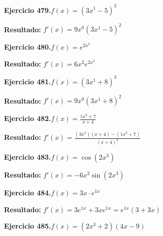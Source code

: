 \documentclass[10pt,a4paper]{article}
\begin{document}
\begin{ejbox}
\textbf{Ejercicio 479.}\quad $f(x) = (3x^{1} -5)^{3}$
\end{ejbox}

\begin{solbox}
\textbf{Resultado:} \(\displaystyle f'(x) = 9x^{0}(3x^{1} -5)^{2}\)
\end{solbox}

\begin{ejbox}
\textbf{Ejercicio 480.}\quad $f(x) = e^{2x^{3}}$
\end{ejbox}

\begin{solbox}
\textbf{Resultado:} \(\displaystyle f'(x) = 6x^{2}e^{2x^{3}}\)
\end{solbox}

\newpage
\begin{ejbox}
\textbf{Ejercicio 481.}\quad $f(x) = (3x^{1} +8)^{3}$
\end{ejbox}

\begin{solbox}
\textbf{Resultado:} \(\displaystyle f'(x) = 9x^{0}(3x^{1} +8)^{2}\)
\end{solbox}

\begin{ejbox}
\textbf{Ejercicio 482.}\quad $f(x) = \frac{1x^{3} +7}{x + 4}$
\end{ejbox}

\begin{solbox}
\textbf{Resultado:} \(\displaystyle f'(x) = \frac{(3x^{2})(x+4) - (1x^{3} +7)}{(x+4)^2}\)
\end{solbox}

\begin{ejbox}
\textbf{Ejercicio 483.}\quad $f(x) = \cos(2x^{3})$
\end{ejbox}

\begin{solbox}
\textbf{Resultado:} \(\displaystyle f'(x) = -6x^{2}\sin(2x^{3})\)
\end{solbox}

\newpage
\begin{ejbox}
\textbf{Ejercicio 484.}\quad $f(x) = 3x \cdot e^{1x}$
\end{ejbox}

\begin{solbox}
\textbf{Resultado:} \(\displaystyle f'(x) = 3e^{1x} + 3xe^{1x} = e^{1x}(3 + 3x)\)
\end{solbox}

\begin{ejbox}
\textbf{Ejercicio 485.}\quad $f(x) = (2x^{3} +2)(4x -9)$
\end{ejbox}
\end{document}
